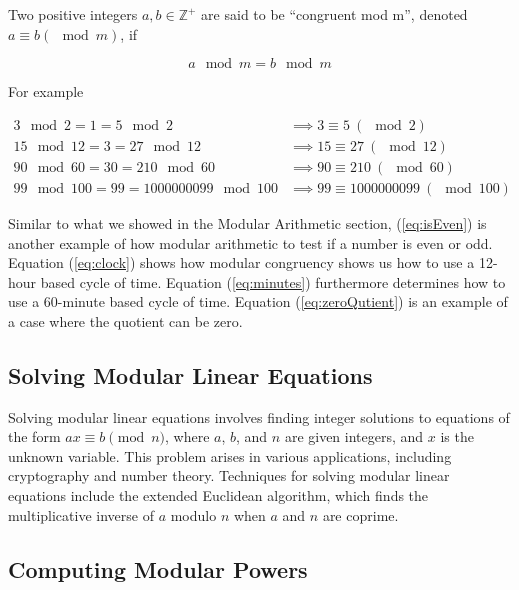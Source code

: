 \documentclass{article}
\renewcommand{\_}{\ifincsname_\else\legacyunderscore\fi}
\begin{document}
        Two positive integers $a, b \in \mathbb{Z}^+$ are said to be ``congruent mod m'', denoted $a \equiv b (\mod m)$, if 

        \begin{equation}
            a \mod m = b \mod m
        \end{equation}

        For example

        \begin{align}
            \label{eq:isEven}      3 \mod 2 = 1 = 5 \mod 2 &\implies 3 \equiv 5 \ (\mod 2) \\
            \label{eq:clock}       15 \mod 12 = 3 = 27 \mod 12 &\implies 15 \equiv 27 \ (\mod 12) \\
            \label{eq:minutes}     90 \mod 60 = 30 = 210 \mod 60 &\implies 90 \equiv 210 \ (\mod 60) \\
            \label{eq:zeroQutient} 99 \mod 100 = 99 = 1000000099 \mod 100 &\implies 99 \equiv 1000000099 \ (\mod 100)
        \end{align}

        Similar to what we showed in the Modular Arithmetic section, (\ref{eq:isEven}) is another example of how modular arithmetic to test if a number is even or odd.  Equation (\ref{eq:clock}) shows how modular congruency shows us how to use a 12-hour based cycle of time.  Equation (\ref{eq:minutes}) furthermore determines how to use a 60-minute based cycle of time.  Equation (\ref{eq:zeroQutient}) is an example of a case where the quotient can be zero.

        \subsection{Solving Modular Linear Equations}

Solving modular linear equations involves finding integer solutions to equations of the form \(ax \equiv b \pmod{n}\), where \(a\), \(b\), and \(n\) are given integers, and \(x\) is the unknown variable. This problem arises in various applications, including cryptography and number theory. Techniques for solving modular linear equations include the extended Euclidean algorithm, which finds the multiplicative inverse of \(a\) modulo \(n\) when \(a\) and \(n\) are coprime.

\subsection{Computing Modular Powers}
\end{document}

